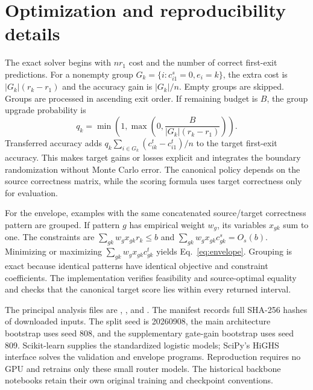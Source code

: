 \documentclass[11pt,a4paper]{article}
\begin{document}
\section{Optimization and reproducibility details}
The exact solver begins with $nr_1$ cost and the number of correct first-exit predictions. For a nonempty group $G_k=\{i:c^s_{i1}=0,e_i=k\}$, the extra cost is $|G_k|(r_k-r_1)$ and the accuracy gain is $|G_k|/n$. Empty groups are skipped. Groups are processed in ascending exit order. If remaining budget is $B$, the group upgrade probability is
\begin{equation}
 q_k=\min\left(1,\max\left(0,\frac{B}{|G_k|(r_k-r_1)}\right)\right).
\end{equation}
Transferred accuracy adds $q_k\sum_{i\in G_k}(c^t_{ik}-c^t_{i1})/n$ to the target first-exit accuracy. This makes target gains or losses explicit and integrates the boundary randomization without Monte Carlo error. The canonical policy depends on the source correctness matrix, while the scoring formula uses target correctness only for evaluation.

For the envelope, examples with the same concatenated source/target correctness pattern are grouped. If pattern $g$ has empirical weight $w_g$, its variables $x_{gk}$ sum to one. The constraints are $\sum_{gk}w_gx_{gk}r_k\leq b$ and $\sum_{gk}w_gx_{gk}c^s_{gk}=O_s(b)$. Minimizing or maximizing $\sum_{gk}w_gx_{gk}c^t_{gk}$ yields Eq.~\eqref{eq:envelope}. Grouping is exact because identical patterns have identical objective and constraint coefficients. The implementation verifies feasibility and source-optimal equality and checks that the canonical target score lies within every returned interval.

The principal analysis files are , , and . The manifest records full SHA-256 hashes of downloaded inputs. The split seed is 20260908, the main architecture bootstrap uses seed 808, and the supplementary gate-gain bootstrap uses seed 809. Scikit-learn supplies the standardized logistic models; SciPy's HiGHS interface solves the validation and envelope programs. Reproduction requires no GPU and retrains only these small router models. The historical backbone notebooks retain their own original training and checkpoint conventions.
\end{document}
